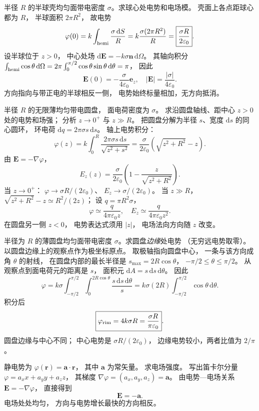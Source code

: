 半径 $R$ 的半球壳均匀面带电密度
$\sigma$。求球心处电势和电场模。
\exsolution
壳面上各点距球心都为 $R$，
半球面积 $2\pi R^2$，
故电势
\[
\varphi(0)=k\int_{\rm hemi}\frac{\sigma\,\mathrm dS}R
=k\frac{\sigma(2\pi R^2)}R
=\boxed{\frac{\sigma R}{2\varepsilon_0}}.
\]
设半球位于 $z>0$，
中心处场
$\mathrm d\bm E=-k\sigma\bm n\,\mathrm d\Omega$。
其轴向积分
$\int_{\rm hemi}\cos\theta\,\mathrm d\Omega
=2\pi\int_0^{\pi/2}\cos\theta\sin\theta\,\mathrm d\theta=\pi$，
因此
\[
\boxed{\bm E(0)=-\frac{\sigma}{4\varepsilon_0}\bm e_z},
\quad
\boxed{|\bm E|=\frac{|\sigma|}{4\varepsilon_0}}.
\]
\excheck 方向指向与带正电的半球相反一侧，
电势始终标量相加，无方向抵消。

半径 $R$ 的无限薄均匀带电圆盘，
面电荷密度为 $\sigma$。
求沿圆盘轴线、距中心 $z>0$ 处的电势和场强；
分析 $z\to0^+$ 与 $z\gg R$。
\exsolution
把圆盘分解为半径 $s$、宽度 $\mathrm ds$
的同心圆环，
环电荷
$\mathrm dq=2\pi\sigma s\,\mathrm ds$。
轴上电势积分：
\[
\varphi(z)=k\int_0^R
\frac{2\pi\sigma s\,\mathrm ds}{\sqrt{z^2+s^2}}
=\boxed{\frac{\sigma}{2\varepsilon_0}
(\sqrt{z^2+R^2}-z)}.
\]
由 $\bm E=-\nabla\varphi$，
\[
\boxed{E_z(z)=\frac{\sigma}{2\varepsilon_0}
\left(1-\frac{z}{\sqrt{z^2+R^2}}\right)}.
\]
当 $z\to0^+$：
$\varphi\to\sigma R/(2\varepsilon_0)$、
$E_z\to\sigma/(2\varepsilon_0)$。
当 $z\gg R$，
$\sqrt{z^2+R^2}-z\simeq R^2/(2z)$；
设 $q=\pi R^2\sigma$，
\[
\boxed{\varphi\simeq\frac{q}{4\pi\varepsilon_0z},
\quad E_z\simeq\frac{q}{4\pi\varepsilon_0z^2}}.
\]
\excheck 在圆盘另一侧 $z<0$，
电势表达式须用 $|z|$，
电场法向方向随 $z$ 改变。

半径为 $R$ 的薄圆盘均匀面带电密度
$\sigma$。求圆盘\emph{边缘}处电势
（无穷远电势取零）。
\exsolution
以圆盘边缘上的观察点作为极坐标原点。
取极轴指向圆盘中心，
一条与该方向成角 $\theta$ 的射线，
在圆盘内部的最长半径是
$s_{\max}=2R\cos\theta$，
$-\pi/2\le\theta\le\pi/2$。
从观察点到面电荷元的距离是 $s$，
面积元
$\mathrm dA=s\,\mathrm ds\,\mathrm d\theta$。
因此
\[
\varphi=k\sigma
\int_{-\pi/2}^{\pi/2}
\int_0^{2R\cos\theta}
\frac{s\,\mathrm ds\,\mathrm d\theta}{s}
=k\sigma(2R)\int_{-\pi/2}^{\pi/2}
\cos\theta\,\mathrm d\theta.
\]
积分后
\[
\boxed{\varphi_{\rm rim}=
4k\sigma R=\frac{\sigma R}{\pi\varepsilon_0}}.
\]
\excheck 圆盘边缘与中心不同；
中心电势是 $\sigma R/(2\varepsilon_0)$，
边缘电势较小，两者比值为 $2/\pi$。

静电势为 $\varphi(\bm r)=\bm a\cdot\bm r$，
其中 $\bm a$ 为常矢量。
求电场强度。
\exsolution
写出笛卡尔分量
$\varphi=a_xx+a_yy+a_zz$，
其梯度
$\nabla\varphi=(a_x,a_y,a_z)=\bm a$。
由电势—电场关系
$\bm E=-\nabla\varphi$，
直接得到
\[
\boxed{\bm E=-\bm a}.
\]
\excheck 电场处处均匀，
方向与电势增长最快的方向相反。

